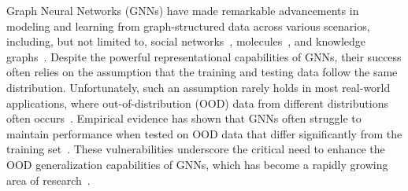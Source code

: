 Graph Neural Networks (GNNs) have made remarkable advancements in modeling and learning from graph-structured data across various scenarios, including, but not limited to, social networks~\citep{fan2020graph,chang2021sequential}, molecules~\citep{shui2020heterogeneous,liu2024data}, and knowledge graphs~\citep{kg_1,kg_2}. Despite the powerful representational capabilities of GNNs, their success often relies on the assumption that the training and testing data follow the same distribution. Unfortunately, such an assumption rarely holds in most real-world applications, where out-of-distribution (OOD) data from different distributions often occurs~\citep{OODsurvey}. Empirical evidence has shown that GNNs often struggle to maintain performance when tested on OOD data that differ significantly from the training set~\citep{OODbench,li2022ood}. These vulnerabilities underscore the critical need to enhance the OOD generalization capabilities of GNNs, which has become a rapidly growing area of research~\citep{good,drugood}.

